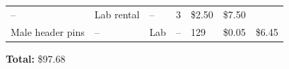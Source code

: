 \documentclass[]{article}
\begin{document}
\begin{longtable}[]{@{}lllllll@{}}
\begin{minipage}[t]{0.15\columnwidth}
--\strut
\end{minipage} & \begin{minipage}[t]{0.10\columnwidth}\raggedright
Lab rental\strut
\end{minipage} & \begin{minipage}[t]{0.17\columnwidth}\raggedright
--\strut
\end{minipage} & \begin{minipage}[t]{0.11\columnwidth}\raggedright
3\strut
\end{minipage} & \begin{minipage}[t]{0.06\columnwidth}\raggedright
\$2.50\strut
\end{minipage} & \begin{minipage}[t]{0.07\columnwidth}\raggedright
\$7.50\strut
\end{minipage}\tabularnewline
\begin{minipage}[t]{0.15\columnwidth}\raggedright
Male header pins\strut
\end{minipage} & \begin{minipage}[t]{0.15\columnwidth}\raggedright
--\strut
\end{minipage} & \begin{minipage}[t]{0.10\columnwidth}\raggedright
Lab\strut
\end{minipage} & \begin{minipage}[t]{0.17\columnwidth}\raggedright
--\strut
\end{minipage} & \begin{minipage}[t]{0.11\columnwidth}\raggedright
129\strut
\end{minipage} & \begin{minipage}[t]{0.06\columnwidth}\raggedright
\$0.05\strut
\end{minipage} & \begin{minipage}[t]{0.07\columnwidth}\raggedright
\$6.45\strut
\end{minipage}\tabularnewline
\bottomrule
\end{longtable}

\textbf{Total:} \$97.68

{}

\end{document}

